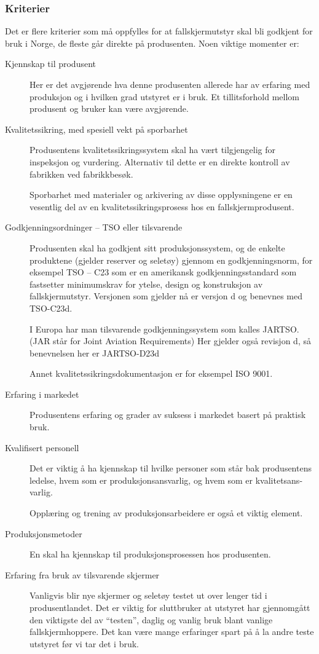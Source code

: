 \subsubsection{Kriterier}
Det er flere kriterier som må oppfylles for at fallskjermutstyr skal bli godkjent for bruk i Norge, de fleste går direkte på produsenten. Noen viktige momenter er:
\begin{description}
	\item[Kjennskap til produsent] Her er det avgjørende hva denne produsenten allerede har av erfaring med produksjon og i hvilken grad utstyret er i bruk. Et tillitsforhold mellom produsent og bruker kan være avgjørende.
	\item[Kvalitetssikring, med spesiell vekt på sporbarhet] Produsentens kvalitetssikringssystem skal ha vært tilgjengelig for inspeksjon og vurdering. Alternativ til dette er en direkte kontroll av fabrikken ved fabrikkbesøk.

	Sporbarhet med materialer og arkivering av disse opplysningene er en vesentlig del av en kvalitetssikringsprosess hos en fallskjermprodusent.

	\item[Godkjenningsordninger – TSO eller tilsvarende] Produsenten skal ha godkjent sitt produksjonssystem, og de enkelte produktene (gjelder reserver og seletøy) gjennom en godkjenningsnorm, for eksempel TSO – C23 som er en amerikansk godkjenningsstandard som fastsetter minimumskrav for ytelse, design og konstruksjon av fallskjermutstyr. Versjonen som gjelder nå er versjon d og benevnes med TSO-C23d.

	I Europa har man tilsvarende godkjenningssystem som kalles JARTSO. (JAR står for Joint Aviation Requirements) Her gjelder også revisjon d, så benevnelsen her er JARTSO-D23d

	Annet kvalitetssikringsdokumentasjon er for eksempel ISO 9001.

	\item[Erfaring i markedet] Produsentens erfaring og grader av suksess i markedet basert på praktisk bruk.
	\item[Kvalifisert personell] Det er viktig å ha kjennskap til hvilke personer som står bak produsentens ledelse, hvem som er produksjonsansvarlig, og hvem som er kvalitetsans- varlig.

	Opplæring og trening av produksjonsarbeidere er også et viktig element.

	\item[Produksjonsmetoder] En skal ha kjennskap til produksjonsprosessen hos produsenten.

	\item[Erfaring fra bruk av tilsvarende skjermer] Vanligvis blir nye skjermer og seletøy testet ut over lenger tid i produsentlandet. Det er viktig for sluttbruker at utstyret har gjennomgått den viktigste del av ``testen'', daglig og vanlig bruk blant vanlige fallskjermhoppere. Det kan være mange erfaringer spart på å la andre teste utstyret før vi tar det i bruk.
\end{description}

